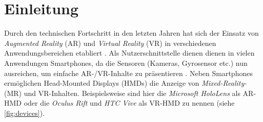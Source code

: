 \chapter{Einleitung}
\label{chap:einleitung}

Durch den technischen Fortschritt in den letzten Jahren hat sich der Einsatz von \emph{Augmented Reality} (AR) und \emph{Virtual Reality} (VR) in verschiedenen Anwendungsbereichen etabliert \parencite{Krevelen2010, Zhao2009, Sharples2008, Jung2008}.
Als Nutzerschnittstelle dienen dienen in vielen Anwendungen Smartphones, da die Sensoren (Kameras, Gyrosensor etc.) nun ausreichen, um einfache AR-/VR-Inhalte zu präsentieren \parencite{Li2017b,Feng2017,Yoo2015,Mulloni2012}.
Neben Smartphones ermöglichen Head-Mounted Displays (HMDs) die Anzeige von \emph{Mixed-Reality-} (MR) und VR-Inhalten.
Beispielsweise sind hier die \emph{Microsoft HoloLens} \parencite{Microsoft2018} als AR-HMD oder die \emph{Oculus Rift} \parencite{Facebook2018} und \emph{HTC Vive} \parencite{HTCCorporation2018} als VR-HMD zu nennen (siehe \autoref{fig:devices}).
